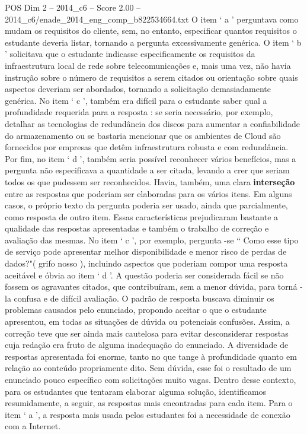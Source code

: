 \begin{textsample}{POS Dim 2 – 2014\_c6 – Score 2.00 – 2014\_c6/enade\_2014\_eng\_comp\_b822534664.txt}
O item ‘ a ’ perguntava como mudam os requisitos do cliente, sem, no entanto, especificar quantos requisitos o estudante deveria listar, tornando a pergunta excessivamente genérica.
O item ‘ b ’ solicitava que o estudante indicasse especificamente os requisitos da infraestrutura local de rede sobre telecomunicações e, mais uma vez, não havia instrução sobre o número de requisitos a serem citados ou orientação sobre quais aspectos deveriam ser abordados, tornando a solicitação demasiadamente genérica.
No item ‘ c ’, também era difícil para o estudante saber qual a profundidade requerida para a resposta : se seria necessário, por exemplo, detalhar as tecnologias de redundância dos discos para aumentar a confiabilidade do armazenamento ou se bastaria mencionar que os ambientes de Cloud são fornecidos por empresas que detêm infraestrutura robusta e com redundância.
Por fim, no item ‘ d ’, também seria possível reconhecer vários benefícios, mas a pergunta não especificava a quantidade a ser citada, levando a crer que seriam todos os que pudessem ser reconhecidos.
Havia, também, uma clara \textbf{interseção} entre as respostas que poderiam ser elaboradas para os vários itens.
Em alguns casos, o próprio texto da pergunta poderia ser usado, ainda que parcialmente, como resposta de outro item.
Essas características prejudicaram bastante a qualidade das respostas apresentadas e também o trabalho de correção e avaliação das mesmas.
No item ‘ c ’, por exemplo, pergunta -se “ Como esse tipo de serviço pode apresentar melhor disponibilidade e menor risco de perdas de dados?"( grifo nosso ), incluindo aspectos que poderiam compor uma resposta aceitável e óbvia ao item ‘ d ’.
A questão poderia ser considerada fácil se não fossem os agravantes citados, que contribuíram, sem a menor dúvida, para torná -la confusa e de difícil avaliação.
O padrão de resposta buscava diminuir os problemas causados pelo enunciado, propondo aceitar o que o estudante apresentou, em todas as situações de dúvida ou potenciais confusões.
Assim, a correção teve que ser ainda mais cautelosa para evitar desconsiderar respostas cuja redação era fruto de alguma inadequação do enunciado.
A diversidade de respostas apresentada foi enorme, tanto no que tange à profundidade quanto em relação ao conteúdo propriamente dito.
Sem dúvida, esse foi o resultado de um enunciado pouco específico com solicitações muito vagas.
Dentro desse contexto, para os estudantes que tentaram elaborar alguma solução, identificamos resumidamente, a seguir, as respostas mais encontradas para cada item.
Para o item ‘ a ’, a resposta mais usada pelos estudantes foi a necessidade de conexão com a Internet.

\end{textsample}

